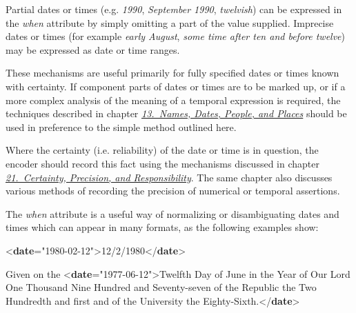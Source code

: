 Partial dates or times (e.g. \textit{1990}, \textit{September 1990}, \textit{twelvish}) can be expressed in the {\itshape when} attribute by simply omitting a part of the value supplied. Imprecise dates or times (for example \textit{early August}, \textit{some time after ten and before twelve}) may be expressed as date or time ranges.\par
These mechanisms are useful primarily for fully specified dates or times known with certainty. If component parts of dates or times are to be marked up, or if a more complex analysis of the meaning of a temporal expression is required, the techniques described in chapter \textit{\hyperref[ND]{13.\ Names, Dates, People, and Places}} should be used in preference to the simple method outlined here.\par
Where the certainty (i.e. reliability) of the date or time is in question, the encoder should record this fact using the mechanisms discussed in chapter \textit{\hyperref[CE]{21.\ Certainty, Precision, and Responsibility}}. The same chapter also discusses various methods of recording the precision of numerical or temporal assertions.\par
The {\itshape when} attribute is a useful way of normalizing or disambiguating dates and times which can appear in many formats, as the following examples show: \par\bgroup{}\exampleFont \begin{shaded}\noindent\mbox{}{<\textbf{date}\hspace*{1em}{when}="{1980-02-12}">}12/2/1980{</\textbf{date}>}\end{shaded}\egroup\par \noindent  \par\bgroup{}\exampleFont \begin{shaded}\noindent\mbox{}Given on the {<\textbf{date}\hspace*{1em}{when}="{1977-06-12}">}Twelfth Day of June\mbox{}\newline 
 in the Year of Our Lord One Thousand Nine Hundred and\mbox{}\newline 
 Seventy-seven of the Republic the Two Hundredth and first\mbox{}\newline 
 and of the University the Eighty-Sixth.{</\textbf{date}>}\end{shaded}\egroup\par \par
